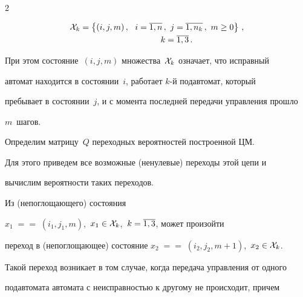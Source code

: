 \begin{multicols}{2}
\noindent





\vspace*{-10pt}





\begin{multline*}


{\cal X}_k


=\left \{(i,j,m)\,,\ \  i=\o{1,n}\,,\   j=\o{1,n_k}\,,\  m\ge0\right \}\,,\\


\ \ \ \ \ \ \ \ \ \ \ \ \ \ k=\o{1,3}\,.


\end{multline*}





\vspace*{-6pt}





\noindent


При этом состояние~$(i,j,m)$ множества~${\cal X}_k$ означает, что исправный


автомат находится в со\-сто\-янии~$i$, работает $k$-й подавтомат, который


пребывает в со\-сто\-янии~$j$, и с момента последней передачи управ\-ле\-ния прошло


$m$~шагов.





 Определим матрицу~$Q$ переходных вероятностей построенной ЦМ.


Для этого приведем все возможные (ненулевые) переходы этой цепи и


вычислим вероятности таких переходов.





Из (непоглощающего) состояния


$x_1\;=$\linebreak $=\;(i_1,j_1,m)$,\ $x_1\in{\cal X}_k$,\ $k=\overline{1,3}$, может произойти


переход в (непоглощающее) состояние $x_2\;=$\linebreak $=\;(i_2,j_2,m+1)$,\ $x_2\in{\cal X}_k$.


Такой переход возникает в том случае, когда передача управления от одного


подавтомата автомата с неисправностью к другому не происходит, причем



\end{multicols}
